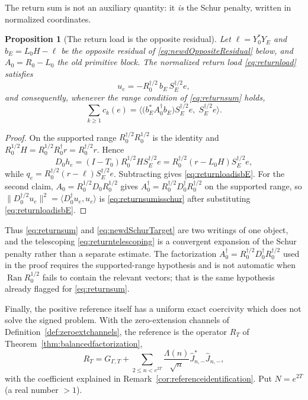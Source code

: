 \documentclass[11pt]{amsart}
\newtheorem{proposition}[theorem]{Proposition}
\theoremstyle{definition}
\theoremstyle{remark}
\begin{document}
The return sum is not an auxiliary quantity: it \emph{is} the Schur penalty,
written in normalized coordinates.

\begin{proposition}[The return load is the opposite residual]
\label{prop:returnisschur}
Let \(\ell=Y_0^*Y_E\) and \(b_E=L_0H-\ell\) be the opposite residual of
\eqref{eq:newdOppositeResidual} below, and \(A_0=R_0-L_0\) the old primitive
block.  The normalized return load \eqref{eq:returnload} satisfies
\begin{equation}\label{eq:returnloadisbE}
 u_e=-R_0^{\dagger/2}\,b_E\,S_E^{\dagger/2}e ,
\end{equation}
and consequently, whenever the range condition of \eqref{eq:returnsum} holds,
\begin{equation}\label{eq:returnsumisschur}
 \sum_{k\ge1}c_k(e)
 =\bigl\langle
    \bigl(b_E^*A_0^\dagger b_E\bigr)S_E^{\dagger/2}e,\;S_E^{\dagger/2}e
  \bigr\rangle .
\end{equation}
\end{proposition}

\begin{proof}
On the supported range \(R_0^{\dagger/2}R_0^{1/2}\) is the identity and
\(R_0^{1/2}H=R_0^{1/2}R_0^\dagger r=R_0^{\dagger/2}r\).  Hence
\[
 D_0h_e=(I-T_0)R_0^{1/2}HS_E^{\dagger/2}e
       =R_0^{\dagger/2}(r-L_0H)S_E^{\dagger/2}e ,
\]
while \(q_e=R_0^{\dagger/2}(r-\ell)S_E^{\dagger/2}e\).  Subtracting gives
\eqref{eq:returnloadisbE}.  For the second claim, \(A_0=R_0^{1/2}D_0R_0^{1/2}\)
gives \(A_0^\dagger=R_0^{\dagger/2}D_0^\dagger R_0^{\dagger/2}\) on the
supported range, so
\(\|D_0^{\dagger/2}u_e\|^2
 =\langle D_0^\dagger u_e,u_e\rangle\) is
\eqref{eq:returnsumisschur} after substituting
\eqref{eq:returnloadisbE}.
\end{proof}

Thus \eqref{eq:returnsum} and \eqref{eq:newdSchurTarget} are two writings of
one object, and the telescoping \eqref{eq:returntelescoping} is a convergent
expansion of the Schur penalty rather than a separate estimate.  The
factorization \(A_0^\dagger=R_0^{\dagger/2}D_0^\dagger R_0^{\dagger/2}\) used
in the proof requires the supported-range hypothesis and is not automatic
when \(\operatorname{Ran}R_0^{1/2}\) fails to contain the relevant vectors;
that is the same hypothesis already flagged for \eqref{eq:returnsum}.

Finally, the positive reference itself has a uniform exact coercivity which
does not solve the signed problem.  With the zero-extension channels of
Definition~\ref{def:zeroextchannels}, the reference is the operator
\(R_T\) of Theorem~\ref{thm:balancedfactorization},
\[
 R_T=G_{\Gamma,T}
 +\sum_{2\le n<e^{2T}}\frac{\Lambda(n)}{\sqrt n}
       \widehat J_{n,-}^*\widehat J_{n,-},
\]
with the coefficient explained in Remark~\ref{cor:referenceidentification}.
Put \(N=e^{2T}\) (a real number \(>1\)).
\end{document}
